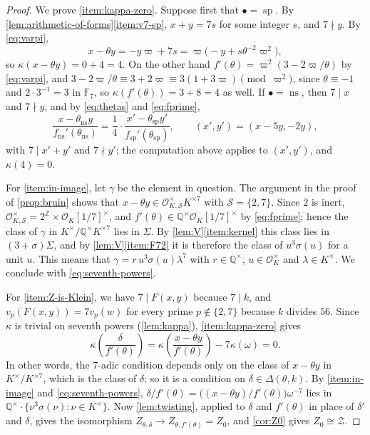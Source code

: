 \documentclass[12pt]{amsart}
\newcommand{\F}{{\mathbb F}}
\newcommand{\Q}{\mathbb{Q}}
\newcommand{\Z}{\mathbb{Z}}
\newcommand{\calS}{{\mathcal S}}
\newcommand{\calZ}{{\mathcal Z}}
\newcommand{\OO}{{\mathcal O}}
\newcommand{\OKS}{\OO_{K,\calS}}
\DeclareMathOperator{\ns}{ns}
\DeclareMathOperator{\spc}{sp}
\numberwithin{equation}{section}
\theoremstyle{definition}
\begin{document}
\begin{proof}
  We prove \eqref{item:kappa-zero}. Suppose first that $\bullet = \spc$. By
  \cref{lem:arithmetic-of-forms}\eqref{item:v7-sp}, $x + y = 7s$ for some integer
  $s$, and $7 \nmid y$. By \cref{eq:varpi},
  \[
    x - \theta y = -y\varpi + 7s = \varpi\bigl(-y + s\theta^{-2}\varpi^{2}\bigr),
  \]
  so $\kappa(x - \theta y) = 0 + 4 = 4$. On the other hand $f'(\theta) =
  \varpi^{2}(3 - 2\varpi/\theta)$ by \cref{eq:varpi}, and $3 - 2\varpi/\theta
  \equiv 3 + 2\varpi \equiv 3(1 + 3\varpi) \pmod{\varpi^{2}}$, since $\theta \equiv -1$
  and $2 \cdot 3^{-1} = 3$ in $\F_7$, so $\kappa(f'(\theta))
  = 3 + 8 = 4$ as well. If $\bullet = \ns$, then $7 \mid x$ and $7 \nmid y$, and by
  \cref{eq:thetas} and \cref{eq:fprime},
  \[
    \frac{x - \theta_{\ns}y}{f_{\ns}'(\theta_{\ns})}
    = \frac{1}{4}\cdot\frac{x' - \theta_{\spc}y'}{f_{\spc}'(\theta_{\spc})},
    \qquad (x',y') = (x - 5y, -2y),
  \]
  with $7 \mid x' + y'$ and $7 \nmid y'$; the computation above applies to
  $(x',y')$, and $\kappa(4) = 0$.

  For \eqref{item:in-image}, let $\gamma$ be the element in question. The
  argument in the proof of \cref{prop:bruin} shows that $x - \theta y \in
  \OKS^{\times}K^{\times 7}$ with $\calS = \{2,7\}$. Since $2$ is inert,
  $\OKS^{\times} = 2^{\Z} \times \OO_K[1/7]^{\times}$, and $f'(\theta) \in
  \Q^{\times}\OO_K[1/7]^{\times}$ by \cref{eq:fprime}; hence the class of
  $\gamma$ in $K^{\times}/\Q^{\times}K^{\times 7}$ lies in $\Sigma$. By
  \cref{lem:V}\eqref{item:kernel} this class lies in $(3+\sigma)\Sigma$, and by
  \cref{lem:V}\eqref{item:F72} it is therefore the class of $u^{3}\sigma(u)$ for
  a unit $u$. This means that $\gamma = r\,u^{3}\sigma(u)\lambda^{7}$ with $r \in
  \Q^{\times}$, $u \in \OO_K^{\times}$ and $\lambda \in K^{\times}$. We conclude with
  \cref{eq:seventh-powers}.

  For \eqref{item:Z-is-Klein}, we have $7 \mid F(x,y)$ because $7 \mid k$, and
  $v_p(F(x,y)) = 7v_p(w)$ for every prime $p \notin \{2,7\}$ because $k$
  divides $56$. Since $\kappa$ is trivial on seventh powers (\cref{lem:kappa}),
  \eqref{item:kappa-zero} gives
  \[
    \kappa\left(\frac{\delta}{f'(\theta)}\right)
    = \kappa\left(\frac{x - \theta y}{f'(\theta)}\right) - 7\kappa(\omega)
    = 0 .
  \]
  In other words, the $7$-adic condition depends only on the class of $x -
  \theta y$ in $K^{\times}/K^{\times 7}$, which is the class of $\delta$; so it
  is a condition on $\delta \in \Delta(\theta,k)$. By \eqref{item:in-image} and
  \cref{eq:seventh-powers}, $\delta/f'(\theta) = \bigl((x-\theta y)/f'(\theta)\bigr)
  \omega^{-7}$ lies in $\Q^{\times}\cdot\{\nu^{3}\sigma(\nu) : \nu \in K^{\times}\}$.
  Now \cref{lem:twisting}, applied to $\delta$ and $f'(\theta)$ in place of
  $\delta'$ and $\delta$, gives the isomorphism $Z_{\theta,\delta} \to
  Z_{\theta,f'(\theta)} = Z_0$, and \cref{cor:Z0} gives $Z_0 \cong \calZ$.
\end{proof}
\end{document}
